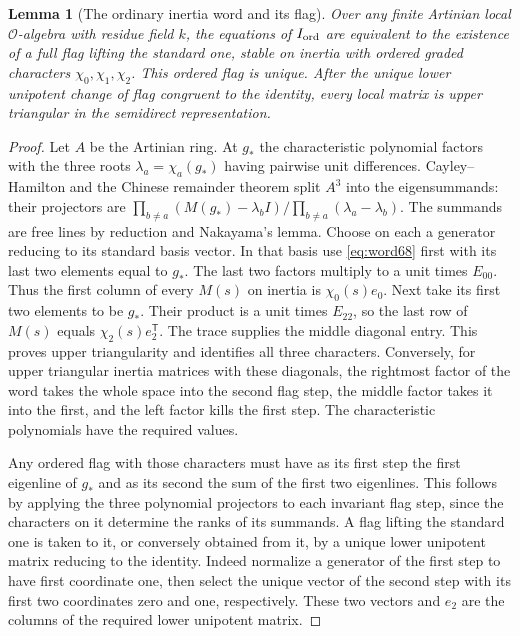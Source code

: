 \documentclass[a4paper,11pt]{article}
\newtheorem{lemma}[proposition]{Lemma}
\theoremstyle{definition}
\theoremstyle{remark}
\numberwithin{equation}{section}
\newcommand{\OO}{\mathcal O}
\begin{document}
\begin{lemma}[The ordinary inertia word and its flag]\label{lem:flag69}
Over any finite Artinian local \(\OO\)-algebra with residue
field \(k\), the equations of \(I_{\rm ord}\) are equivalent to
the existence of a full flag lifting the standard one, stable on
inertia with ordered graded characters \(\chi_0,\chi_1,\chi_2\).
This ordered flag is unique. After the unique lower unipotent
change of flag congruent to the identity, every local matrix is
upper triangular in the semidirect representation.
\end{lemma}
\begin{proof}
Let \(A\) be the Artinian ring. At \(g_*\) the characteristic
polynomial factors with the three roots \(\lambda_a=\chi_a(g_*)\)
having pairwise unit differences. Cayley--Hamilton and the
Chinese remainder theorem split \(A^3\) into the eigensummands:
their projectors are \(\prod_{b\ne a}(M(g_*)-\lambda_b I)/
\prod_{b\ne a}(\lambda_a-\lambda_b)\). The summands are free
lines by reduction and Nakayama's lemma. Choose on each a
generator reducing to its standard basis vector. In that basis
use \eqref{eq:word68} first with its last two elements equal
to \(g_*\). The last two factors multiply to a unit times
\(E_{00}\). Thus the first column of every \(M(s)\) on inertia
is \(\chi_0(s)e_0\). Next take its first two elements to be
\(g_*\). Their product is a unit times \(E_{22}\), so the
last row of \(M(s)\) equals \(\chi_2(s)e_2^{\mathsf T}\).
The trace supplies the middle diagonal entry. This proves
upper triangularity and identifies all three characters.
Conversely, for upper triangular inertia matrices with these
diagonals, the rightmost factor of the word takes the whole space
into the second flag step, the middle factor takes it into the
first, and the left factor kills the first step. The characteristic
polynomials have the required values.

Any ordered flag with those characters must have as its first
step the first eigenline of \(g_*\) and as its second the sum
of the first two eigenlines. This follows by applying the
three polynomial projectors to each invariant flag step, since
the characters on it determine the ranks of its summands.
A flag lifting the standard one is taken to it, or conversely
obtained from it, by a unique lower unipotent matrix reducing
to the identity. Indeed normalize a generator of the first step
to have first coordinate one, then select the unique vector
of the second step with its first two coordinates zero and
one, respectively. These two vectors and \(e_2\) are the
columns of the required lower unipotent matrix.


\end{proof}
\end{document}
